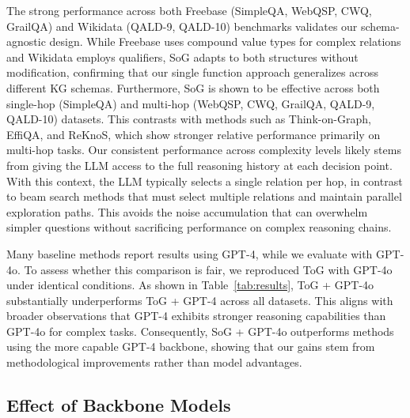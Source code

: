 \documentclass[sigconf]{acmart}
\begin{document}

The strong performance across both Freebase (SimpleQA, WebQSP, CWQ, GrailQA) and Wikidata (QALD-9, QALD-10) benchmarks validates our schema-agnostic design. While Freebase uses compound value types for complex relations and Wikidata employs qualifiers, SoG adapts to both structures without modification, confirming that our single function approach generalizes across different KG schemas. Furthermore, SoG is shown to be effective across both single-hop (SimpleQA) and multi-hop (WebQSP, CWQ, GrailQA, QALD-9, QALD-10) datasets. This contrasts with methods such as Think-on-Graph, EffiQA, and ReKnoS, which show stronger relative performance primarily on multi-hop tasks. Our consistent performance across complexity levels likely stems from giving the LLM access to the full reasoning history at each decision point. With this context, the LLM typically selects a single relation per hop, in contrast to beam search methods that must select multiple relations and maintain parallel exploration paths. This avoids the noise accumulation that can overwhelm simpler questions without sacrificing performance on complex reasoning chains.



Many baseline methods report results using GPT-4, while we evaluate with GPT-4o. To assess whether this comparison is fair, we reproduced ToG with GPT-4o under identical conditions. As shown in Table~\ref{tab:results}, ToG + GPT-4o substantially underperforms ToG + GPT-4 across all datasets. This aligns with broader observations that GPT-4 exhibits stronger reasoning capabilities than GPT-4o for complex tasks. Consequently, SoG + GPT-4o outperforms methods using the more capable GPT-4 backbone, showing that our gains stem from methodological improvements rather than model advantages.

\subsection{Effect of Backbone Models}
\label{sec:backbone}
\end{document}

